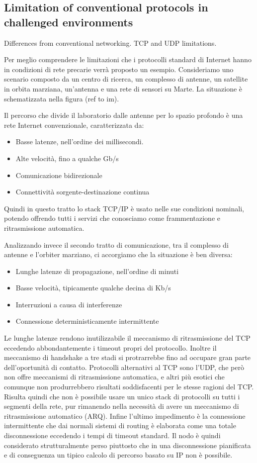 \documentclass[a4paper]{article}
\begin{document}
		\subsection{Limitation of conventional protocols in challenged environments}
		{\sc Differences from conventional networking.
		TCP and UDP limitations.}
		
		Per meglio comprendere le limitazioni che i protocolli standard di Internet hanno in condizioni di rete precarie verrà proposto un esempio. Consideriamo uno scenario composto da un centro di ricerca, un complesso di antenne, un satellite in orbita marziana, un'antenna e una rete di sensori su Marte. La situazione è schematizzata nella figura (ref to im). 
		
		Il percorso che divide il laboratorio dalle antenne per lo spazio profondo è una rete Internet convenzionale, caratterizzata da:
		\begin{itemize}
			\item Basse latenze, nell'ordine dei millisecondi.
			\item Alte velocità, fino a qualche Gb/s
			\item Comunicazione bidirezionale
			\item Connettività sorgente-destinazione continua
		\end{itemize}
		Quindi in questo tratto lo stack TCP/IP è usato nelle sue condizioni nominali, potendo offrendo tutti i servizi che conosciamo come frammentazione e ritrasmissione automatica. 
		
		Analizzando invece il secondo tratto di comunicazione, tra il complesso di antenne e l'orbiter marziano, ci accorgiamo che la situazione è ben diversa:
		\begin{itemize}
			\item Lunghe latenze di propagazione, nell'ordine di minuti
			\item Basse velocità, tipicamente qualche decina di Kb/s
			\item Interruzioni a causa di interferenze
			\item Connessione deterministicamente intermittente
		\end{itemize}
		Le lunghe latenze rendono inutilizzabile il meccanismo di ritrasmissione del TCP eccedendo abbondantemente i timeout propri del protocollo. Inoltre il meccanismo di handshake a tre stadi si protrarrebbe fino ad occupare gran parte dell'oportunità di contatto. Protocolli alternativi al TCP sono l'UDP, che però non offre meccanismi di ritrasmissione automatica, e altri più esotici che comunque non produrrebbero risultati soddisfacenti per le stesse ragioni del TCP.
		Risulta quindi che non è possibile usare un unico stack di protocolli su tutti i segmenti della rete, pur rimanendo nella necessità di avere un meccanismo di ritrasmissione automatico (ARQ). 
		Infine l'ultimo impedimento è la connessione intermittente che dai normali sistemi di routing è elaborata come una totale disconnessione eccedendo i tempi di timeout standard. Il nodo è quindi considerato strutturalmente perso piuttosto che in una disconnessione pianificata e di conseguenza un tipico calcolo di percorso basato su IP non è possibile.
		
\end{document}
